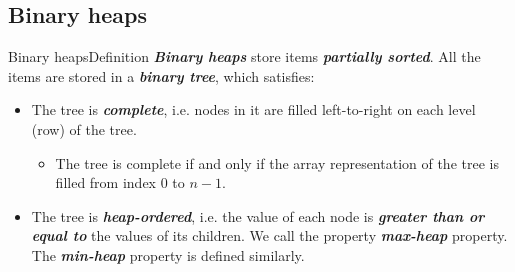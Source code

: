 \documentclass[aspectratio=169]{ctexbeamer}
\newcommand{\highlight}[1]{\textbf{\textit{#1}}}
\begin{document}
    \subsection{Binary heaps}

    \begin{frame}{Binary heaps}{Definition}
        \highlight{Binary heaps} store items \highlight{partially sorted}. All the items are stored in a \highlight{binary tree}, which satisfies:
        \begin{itemize}
            \item The tree is \highlight{complete}, i.e. nodes in it are filled left-to-right on each level (row) of the tree.
            \begin{itemize}
                \item The tree is complete if and only if the array representation of the tree is filled from index 0 to $n-1$.
            \end{itemize}
            \item The tree is \highlight{heap-ordered}, i.e. the value of each node is \highlight{greater than or equal to} the values of its children. We call the property \highlight{max-heap} property. The \highlight{min-heap} property is defined similarly.
        \end{itemize}
    \end{frame}
\end{document}
